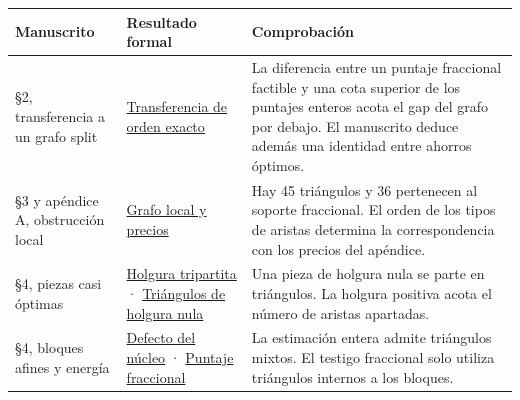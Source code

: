 \documentclass[spanish,11pt,a4paper]{article}
\newcounter{none}
\begin{document}
{\def\LTcaptype{none} %
\begin{longtable}[]{@{}
  >{\raggedright\arraybackslash}p{}
  >{\raggedright\arraybackslash}p{}
  >{\raggedright\arraybackslash}p{}@{}}
\toprule\noalign{}
\begin{minipage}[b]{\linewidth}\raggedright
Manuscrito
\end{minipage} & \begin{minipage}[b]{\linewidth}\raggedright
Resultado formal
\end{minipage} & \begin{minipage}[b]{\linewidth}\raggedright
Comprobación
\end{minipage} \\
\midrule\noalign{}
\endhead
\bottomrule\noalign{}
\endlastfoot
§2, transferencia a un grafo split & \href{https://github.com/jtraverso/split-clique-partition-gap/blob/ccb5444b2ecdff9de1d6221133633a25a224953d/R434/ExactGraphTransfer.lean}{Transferencia de orden exacto} & La diferencia entre un puntaje fraccional factible y una cota superior de los puntajes enteros acota el gap del grafo por debajo. El manuscrito deduce además una identidad entre ahorros óptimos. \\
§3 y apéndice A, obstrucción local & \href{https://github.com/jtraverso/split-clique-partition-gap/blob/ccb5444b2ecdff9de1d6221133633a25a224953d/R434/LocalH54.lean}{Grafo local y precios} & Hay 45 triángulos y 36 pertenecen al soporte fraccional. El orden de los tipos de aristas determina la correspondencia con los precios del apéndice. \\
§4, piezas casi óptimas & \href{https://github.com/jtraverso/split-clique-partition-gap/blob/ccb5444b2ecdff9de1d6221133633a25a224953d/R434/TripartiteSlack.lean}{Holgura tripartita} · \href{https://github.com/jtraverso/split-clique-partition-gap/blob/ccb5444b2ecdff9de1d6221133633a25a224953d/R434/TightTriangles.lean}{Triángulos de holgura nula} & Una pieza de holgura nula se parte en triángulos. La holgura positiva acota el número de aristas apartadas. \\
§4, bloques afines y energía & \href{https://github.com/jtraverso/split-clique-partition-gap/blob/ccb5444b2ecdff9de1d6221133633a25a224953d/R434/CoreDefect.lean}{Defecto del núcleo} · \href{https://github.com/jtraverso/split-clique-partition-gap/blob/ccb5444b2ecdff9de1d6221133633a25a224953d/R434/CoreFractional.lean}{Puntaje fraccional} & La estimación entera admite triángulos mixtos. El testigo fraccional solo utiliza triángulos internos a los bloques. \\

\end{longtable}}
\end{document}
